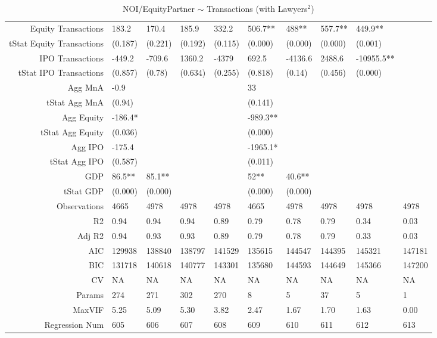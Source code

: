 \begin{table}[ht]
\begin{tabular}{rlllllllll}
  Equity Transactions & 183.2 & 170.4 & 185.9 & 332.2 & 506.7** & 488** & 557.7** & 449.9** &  \\ 
  tStat Equity Transactions & (0.187) & (0.221) & (0.192) & (0.115) & (0.000) & (0.000) & (0.000) & (0.001) &  \\ 
  IPO Transactions & -449.2 & -709.6 & 1360.2 & -4379 & 692.5 & -4136.6 & 2488.6 & -10955.5** &  \\ 
  tStat IPO Transactions & (0.857) & (0.78) & (0.634) & (0.255) & (0.818) & (0.14) & (0.456) & (0.000) &  \\ 
  Agg MnA & -0.9 &  &  &  & 33 &  &  &  &  \\ 
  tStat Agg MnA & (0.94) &  &  &  & (0.141) &  &  &  &  \\ 
  Agg Equity & -186.4* &  &  &  & -989.3** &  &  &  &  \\ 
  tStat Agg Equity & (0.036) &  &  &  & (0.000) &  &  &  &  \\ 
  Agg IPO & -175.4 &  &  &  & -1965.1* &  &  &  &  \\ 
  tStat Agg IPO & (0.587) &  &  &  & (0.011) &  &  &  &  \\ 
  GDP & 86.5** & 85.1** &  &  & 52** & 40.6** &  &  &  \\ 
  tStat GDP & (0.000) & (0.000) &  &  & (0.000) & (0.000) &  &  &  \\ 
  Observations & 4665 & 4978 & 4978 & 4978 & 4665 & 4978 & 4978 & 4978 & 4978 \\ 
  R2 & 0.94 & 0.94 & 0.94 & 0.89 & 0.79 & 0.78 & 0.79 & 0.34 & 0.03 \\ 
  Adj R2 & 0.94 & 0.93 & 0.93 & 0.89 & 0.79 & 0.78 & 0.79 & 0.33 & 0.03 \\ 
  AIC & 129938 & 138840 & 138797 & 141529 & 135615 & 144547 & 144395 & 145321 & 147181 \\ 
  BIC & 131718 & 140618 & 140777 & 143301 & 135680 & 144593 & 144649 & 145366 & 147200 \\ 
  CV & NA & NA & NA & NA & NA & NA & NA & NA & NA \\ 
  Params & 274 & 271 & 302 & 270 & 8 & 5 & 37 & 5 & 1 \\ 
  MaxVIF & 5.25 & 5.09 & 5.30 & 3.82 & 2.47 & 1.67 & 1.70 & 1.63 & 0.00 \\ 
  Regression Num & 605 & 606 & 607 & 608 & 609 & 610 & 611 & 612 & 613 \\ 
   \hline
\end{tabular}
\caption{NOI/EquityPartner $\sim$ Transactions (with Lawyers$^2$)} 
\end{table}
